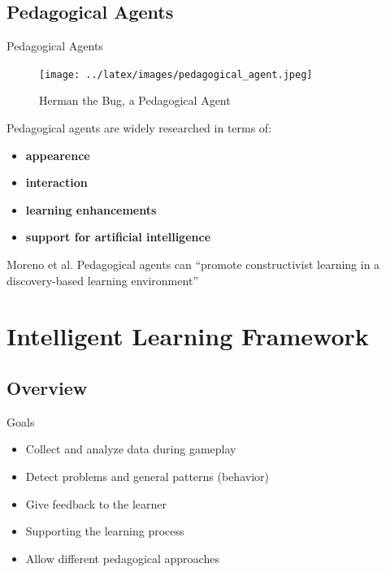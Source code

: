 \documentclass[compress]{beamer}
\begin{document}
\subsection{Pedagogical Agents}
\begin{frame}[allowframebreaks]{Pedagogical Agents}
\begin{figure}[t]
    \centering
    \texttt{[image: ../latex/images/pedagogical\_agent.jpeg]}
    \caption[Herman the Bug, a Pedagogical Agent]
    {Herman the Bug, a Pedagogical Agent \cite{Lester1997c}}
\end{figure}
\end{frame}

\begin{frame}%
\begin{block}{Pedagogical agents are widely researched in terms of:}
\begin{itemize}
\pause
\item \textbf{appearence} \cite{Johnson2000, Slater2000a, Voerman1997a}
\pause
\item \textbf{interaction} \cite{Slater2000a, Baylor2003b}
\pause
\item \textbf{learning enhancements} \cite{Conati2004b, Baylor2003b, Blanchard2004b, Voerman1997a}
\pause
\item \textbf{support for artificial intelligence} \cite{Nunes2002b}
\end{itemize}
\end{block}

\pause

\begin{block}{Moreno et al.}
Pedagogical agents can ``promote constructivist learning in a
discovery-based learning environment''\cite{Moreno2000a}
\end{block}
\end{frame}

\section{Intelligent Learning Framework}
\subsection{Overview}

\begin{frame}{Goals}
\pause
\begin{itemize}
\item Collect and analyze data during gameplay
\item Detect problems and general patterns (behavior)
\pause
\item Give feedback to the learner
\item Supporting the learning process
\item Allow different pedagogical approaches
\end{itemize}
\end{frame}
\end{document}
